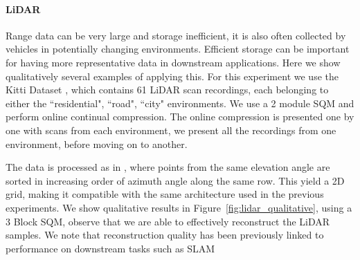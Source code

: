 \documentclass[colorinlistoftodos]{article} %
\begin{document}
\paragraph{LiDAR} Range data can be very large and storage inefficient, it is also often collected by vehicles in potentially changing environments. Efficient storage can be important for having more representative data in downstream applications. Here we show qualitatively several examples of applying this.   
For this experiment we use the Kitti Dataset \citep{geiger2013vision}, which contains 61 LiDAR scan recordings, each belonging to either the ``residential", ``road", ``city" environments. We use a 2 module SQM and perform online continual compression. The online compression is presented one by one with scans from each environment, we present all the recordings from one environment, before moving on to another. 

The data is processed as in \cite{caccia2018deep}, where points from the same elevation angle are sorted in increasing order of azimuth angle along the same row. This yield a 2D grid, making it compatible with the same architecture used in the previous experiments. We show qualitative results in Figure~\ref{fig:lidar_qualitative}, using a 3 Block SQM, observe that we are able to effectively reconstruct the LiDAR samples. We note that reconstruction quality has been previously linked to performance on downstream tasks such as SLAM \cite{zhang2014loam}

\end{document}

